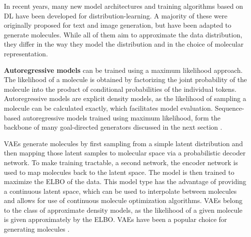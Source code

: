 In recent years, many new model architectures and training algorithms based on \ac{DL} have been
developed for distribution-learning. A majority of these were originally proposed for text and
image generation, but have been adapted to generate molecules. While all of them aim to approximate
the data distribution, they differ in the way they model the distribution and in the choice of
molecular representation.

\textbf{Autoregressive models} can be trained using a maximum likelihood approach. The likelihood of
a molecule is obtained by factorizing the joint probability of the molecule into the product of
conditional probabilities of the individual tokens. Autoregressive models are explicit density
models, as the likelihood of sampling a molecule can be calculated exactly, which facilitates model
evaluation. Sequence-based autoregressive models trained using maximum likelihood, form the backbone
of many goal-directed generators discussed in the next section
\citep{gomez-bombarelliAutomaticChemicalDesign2018,seglerGeneratingFocusedMolecule2018,olivecronaMolecularDenovoDesign2017,guoAugmentedMemorySampleEfficient2024,thomasAugmentedHillClimbIncreases2022,jaquesSequenceTutorConservative2016,cohen-karlikOvercomingOrderAutoregressive2024}.

\Acp{VAE} \citep{kingmaAutoEncodingVariationalBayes2013} generate molecules by first sampling from a
simple latent distribution and then mapping those latent samples to molecular space via a
probabilistic decoder network. To make training tractable, a second network, the encoder network is
used to map molecules back to the latent space. The model is then trained to maximize the \ac{ELBO}
of the data.
This model type has the advantage of providing a continuous latent space, which can be used to
interpolate between molecules and allows for use of continuous molecule optimization algorithms.
\acp{VAE} belong to the class of approximate density models, as the likelihood of
a given molecule is given approximately by the \ac{ELBO}. \acp{VAE} have been a
popular choice for generating molecules
\citep{gomez-bombarelliAutomaticChemicalDesign2018,kusnerGrammarVariationalAutoencoder2017,simonovskyGraphVAEGenerationSmall2018,samantaNEVAEDeepGenerative2020,jinJunctionTreeVariational2018,daiSyntaxDirectedVariationalAutoencoder2018,liuConstrainedGraphVariational2018}.

